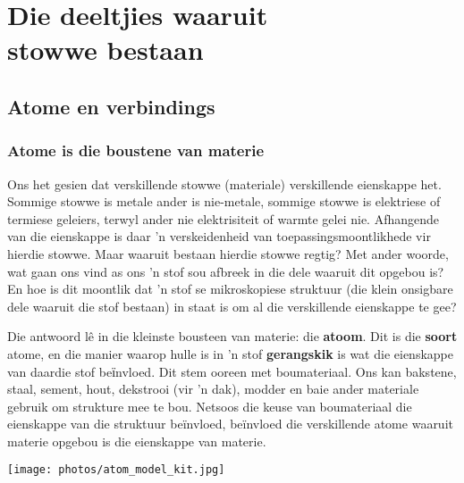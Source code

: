          \chapter{Die deeltjies waaruit\\stowwe bestaan}
\label{chap:composition}
    \setcounter{figure}{1}
    \setcounter{subfigure}{1}
    \label{m38120}
\section{Atome en verbindings}
    \subsection*{Atome is die boustene van materie}
            \nopagebreak

      \label{m38120*id307092}Ons het gesien dat verskillende stowwe (materiale) verskillende eienskappe het. Sommige stowwe is metale ander is nie-metale, sommige stowwe is elektriese of termiese geleiers, terwyl ander nie elektrisiteit of warmte gelei nie. Afhangende van die eienskappe is daar  'n verskeidenheid van toepassingsmoontlikhede vir hierdie stowwe. Maar waaruit bestaan hierdie stowwe regtig? Met ander woorde, wat gaan ons vind as ons  'n stof sou afbreek in die dele waaruit dit opgebou is? En hoe is dit moontlik dat  'n stof se mikroskopiese struktuur (die klein onsigbare dele waaruit die stof bestaan) in staat is om al die verskillende eienskappe te gee? \par 
\begin{minipage}{.6\textwidth}
      \label{m38120*id307099}
Die antwoord l\^{e} in die kleinste bousteen van materie: die \textbf{atoom}. Dit is die \textbf{soort} atome, en die manier waarop hulle is in  'n stof \textbf{gerangskik} is wat die eienskappe van daardie stof beїnvloed. Dit stem ooreen met boumateriaal. Ons kan bakstene, staal, sement, hout, dekstrooi (vir  'n dak), modder en baie ander materiale gebruik om strukture mee te bou. Netsoos die keuse van boumateriaal die eienskappe van die struktuur beïnvloed, beïnvloed die verskillende atome waaruit materie opgebou is die eienskappe van materie.\par 
\end{minipage}
\begin{minipage}{.4\textwidth}
 \begin{center}
\texttt{[image: photos/atom\_model\_kit.jpg]}
 \end{center}
\end{minipage}

